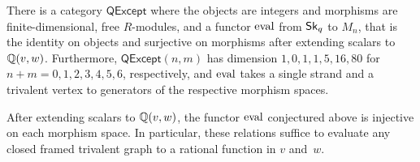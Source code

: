 \documentclass[12pt]{amsart}
\begin{document}
\begin{conjecture}
  \label{conj:quant-consist}
  There is a category $\mathsf{QExcept}$ where the objects are
  integers and morphisms are finite-dimensional, free $R$-modules, and
  a functor $\operatorname{eval}$ from $\mathop{\mathsf{Sk}_q}$ to $M_n$, that is the identity on
  objects and surjective on morphisms after extending scalars to
  $\mathbb Q(v,w)$. Furthermore, $\mathsf{QExcept}(n,m)$ has dimension
  $1,\allowbreak0,\allowbreak1,\allowbreak1,\allowbreak5,\allowbreak16,\allowbreak80$
  for $n+m=0,1,2,3,4,5,6$, respectively, and $\operatorname{eval}$ takes a single
  strand and a trivalent vertex to generators of the respective
  morphism spaces.
\end{conjecture}

\begin{conjecture}
  \label{conj:quant-suffic}
  After extending scalars to $\mathbb Q(v,w)$, the functor $\operatorname{eval}$
  conjectured above is injective on each morphism space. In
  particular, these relations suffice to evaluate any closed framed
  trivalent graph to a rational function in $v$ and~$w$.
\end{conjecture}


  

\renewcommand*{\bibfont}{\small}
\setlength{\bibitemsep}{0pt}
\raggedright
\printbibliography
\end{document}
